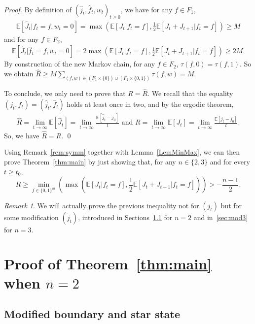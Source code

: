 \documentclass[11pt]{article}
\theoremstyle{plain}
\theoremstyle{definition}
\theoremstyle{remark}
\newtheorem{remark}{Remark}
\newcommand{\esp}[1]{\mathbb{E}\left[ #1 \right]}
\begin{document}
\begin{proof}
By definition of $(\hat{j}_t,\hat{f}_t,w_t)_{t\geq 0}$, we have for any $f\in F_1$,
\begin{align*}
    \esp{\hat{J}_t | \hat{f}_t = f, w_t=0} = \max \left( \esp{J_t | f_t = f},\frac{1}{2} \esp{J_t + J_{t+1} | f_t = f} \right) \geq M
\end{align*}
and for any $f \in F_2$, 
\begin{align*}
     \esp{\hat{J}_{t} | \hat{f}_t = f, w_t=0} = 2\max \left( \esp{J_t | f_t = f}, \frac{1}{2} \esp{J_t + J_{t+1} | f_t = f} \right) \geq 2M.
\end{align*} 
By construction of the new Markov chain, for any $f \in F_2$, $\tau(f,0) = \tau(f,1)$. So we obtain 
$\hat{R} \geq M \sum_{(f,w) \in (F_1\times\{0\}) \cup (F_2 \times \{0,1\})} \tau(f,w) = M$.

To conclude, we only need to prove that $R = \hat{R}$. We recall that the equality $(j_t,f_t) = (\hat{j}_t,\hat{f}_t)$ holds at least once in two, and by the ergodic theorem,
\begin{align*}
    \hat{R} = \lim_{t \to \infty} \esp{\hat{J}_t} = \lim_{t \to \infty} \frac{\esp{\hat{j}_t-j_0}}{t} \text{ and } R = \lim_{t \to \infty} \esp{J_t} = \lim_{t \to \infty} \frac{\esp{j_t-j_0}}{t}.
\end{align*}
So, we have $\hat{R} = R$. \qed
\end{proof}
Using Remark~\ref{rem:symm} together with Lemma~\ref{LemMinMax}, we can then prove Theorem~\ref{thm:main} by just showing that, for any $n \in \{2,3\}$ and for every $t\geq t_0$,
\begin{equation} \label{eq:goal}
  R \geq \min_{f \in \{0,1\}^m}\left( \max \left( \esp{J_t|f_t = f},\frac{1}{2}\esp{J_{t}+J_{t+1} |f_t = f} \right) \right) > -\frac{n-1}{2}.
\end{equation}

\begin{remark}\label{rem:modified}
We will actually prove the previous inequality not for $(j_t)$ but for some modification $(\tilde j_t)$, introduced in Sections~\ref{sec:mod2} for $n=2$ and in~\ref{sec:mod3} for $n=3$.
\end{remark}

\section{Proof of Theorem~\ref{thm:main} when $n=2$} \label{sec:proof2}

\subsection{Modified boundary and star state}\label{sec:mod2}
\end{document}
